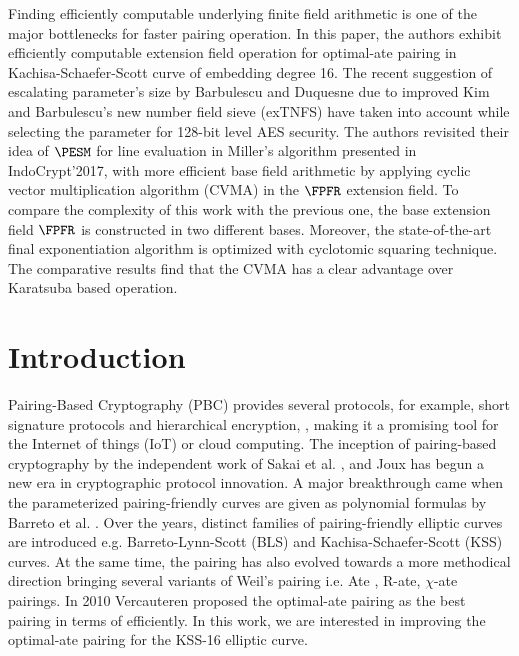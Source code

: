 Finding efficiently computable underlying finite field arithmetic is one of the major bottlenecks for faster pairing operation.
In this paper, the authors exhibit efficiently computable extension field operation for optimal-ate pairing in Kachisa-Schaefer-Scott curve of embedding degree 16. 
The recent suggestion of escalating parameter's size by Barbulescu and Duquesne due to improved Kim and Barbulescu's new number field sieve (exTNFS) have taken into account while selecting the parameter for 128-bit  level AES security.
The authors revisited their idea of $\PESM$ for line evaluation in Miller's algorithm presented in IndoCrypt'2017, with more efficient base field arithmetic by applying cyclic vector multiplication algorithm (CVMA) in the $\FPFR$ extension field.
To compare the complexity of this work with the previous one,
the base extension field $\FPFR$ is constructed in two different bases.
Moreover, the state-of-the-art final exponentiation algorithm is optimized with cyclotomic squaring technique. 
The comparative results find that the CVMA has a clear advantage over Karatsuba based operation.

\section{Introduction}
\label{intro}
Pairing-Based Cryptography (PBC) provides several protocols, for example, short signature protocols and hierarchical encryption,   \cite{NIST,Sha1984}, making it a promising tool for the Internet of things (IoT) or cloud computing.
The inception of  pairing-based cryptography by the independent work of Sakai et al. \cite{sakai2000cryptosystems}, and Joux \cite{joux} has begun a new era in cryptographic protocol innovation.
A major breakthrough came when the parameterized pairing-friendly curves are given as polynomial formulas by Barreto et al. \cite{BN}. 
Over the years, distinct families of pairing-friendly elliptic curves are introduced e.g. Barreto-Lynn-Scott (BLS) \cite{ec_ex} and Kachisa-Schaefer-Scott (KSS) \cite{kss} curves. 
At the same time, the pairing has also evolved towards a more methodical direction bringing several variants of Weil's pairing i.e. Ate \cite{ate}, R-ate\cite{r_ate}, $\chi$-ate \cite{chibasedBN} pairings. 
In 2010 Vercauteren proposed the optimal-ate pairing \cite{op_ate_p} as the best pairing in terms of efficiently. 
In this work, we are interested in improving the optimal-ate pairing for the KSS-16 elliptic curve. 

